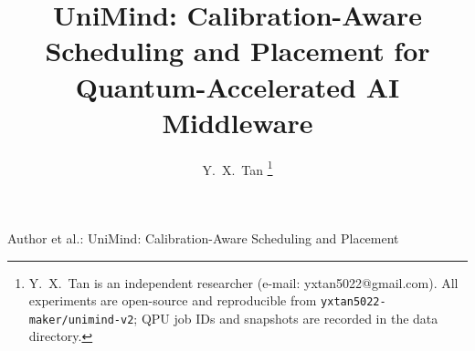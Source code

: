 \documentclass[journal,10pt,twocolumn]{IEEEtran}
\begin{document}
\title{UniMind: Calibration-Aware Scheduling and Placement for Quantum-Accelerated AI Middleware}

\author{Y.~X.~Tan%
\thanks{Y.~X.~Tan is an independent researcher (e-mail: yxtan5022@gmail.com). All experiments are open-source and
reproducible from \texttt{yxtan5022-maker/unimind-v2}; QPU job IDs and snapshots are recorded in the data directory.}}

%
{Author \MakeLowercase{et al.}: UniMind: Calibration-Aware Scheduling and Placement}

\maketitle

\end{document}
